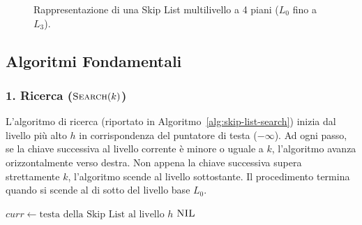 \begin{figure}[H]
\caption{Rappresentazione di una Skip List multilivello a 4 piani ($L_0$ fino a $L_3$).}
\label{fig:multilevel-skip-list}
\end{figure}

\FloatBarrier
\subsection{Algoritmi Fondamentali}

\subsubsection{1. Ricerca ($\textsc{Search}(k)$)}
L'algoritmo di ricerca (riportato in Algoritmo~\ref{alg:skip-list-search}) inizia dal livello più alto $h$ in corrispondenza del puntatore di testa ($-\infty$). Ad ogni passo, se la chiave successiva al livello corrente è minore o uguale a $k$, l'algoritmo avanza orizzontalmente verso destra. Non appena la chiave successiva supera strettamente $k$, l'algoritmo scende al livello sottostante. Il procedimento termina quando si scende al di sotto del livello base $L_0$.

\begin{algorithm}[htbp]
\caption{Ricerca in una Skip List ($\textsc{Search}(k)$)}
\label{alg:skip-list-search}

$curr \leftarrow \text{testa della Skip List al livello } h$\;
\Return $\textsc{NIL}$\;
\end{algorithm}


